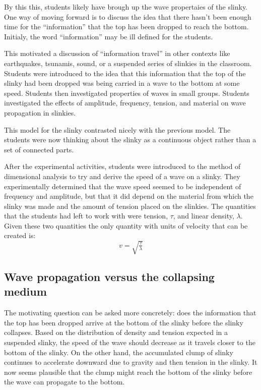 \documentclass[aps,pre,10pt,superscriptaddress,showpacs,amsmath,amssymb,nofootinbib]{revtex4-1}
\begin{document}
By this this, students likely have brough up the wave propertaies of the slinky. One way of moving forward
is to discuss the idea that there hasn't been enough time for the ``information'' that the top has been 
dropped to reach the bottom. Initialy, the word ``information''
may be ill defined for the students.

This motivated a discussion of ``information travel'' in other contexts like earthquakes, tsunamis, 
sound, or a suspended series of slinkies in the classroom. Students were introduced to the idea that
this information that the top of the slinky had been dropped was being carried in a wave to the bottom
at some speed. Students then investigated properties of waves in small groups. Students investigated the
effects of amplitude, frequency, tension, and material on wave propagation in slinkies.

This model for the slinky contrasted nicely with the previous model. The students were now thinking about
the slinky as a continuous object rather than a set of connected parts.

After the experimental activities, students were introduced to the method of dimensional analysis
to try and derive the speed of a wave on a slinky. They experimentally determined that the wave speed
seemed to be independent of frequency and amplitude, but that it did depend on the material from which
the slinky was made and the amount of tension placed on the slinkies. The quantities that the students
had left to work with were tension, $\tau$, and linear density, $\lambda$. Given these two quantities
the only quantity with units of velocity that can be created is:
\begin{equation}
  \label{eq:wavespeed}
  v=\sqrt{\tfrac{\tau}{\lambda}}
\end{equation}
\subsection{Wave propagation versus the collapsing medium}
The motivating question can be asked more concretely: does the information that the top has been
dropped arrive at the bottom of the slinky before the slinky collapses. Based on the distribution 
of density and tension expected in a suspended slinky, the speed of the wave should decrease as
it travels closer to the bottom of the slinky. On the other hand, the accumulated clump of slinky
continues to accelerate downward due to gravity and then tension in the slinky. It now seems plausible
that the clump might reach the bottom of the slinky before the wave can propagate to the bottom.
\end{document}
